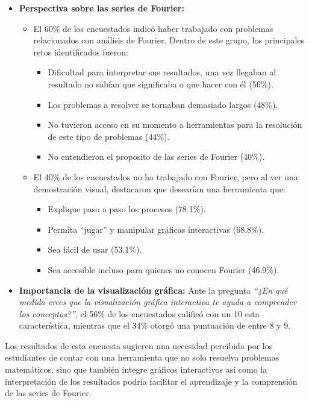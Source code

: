 \begin{itemize}
	\item \textbf{Perspectiva sobre las series de Fourier:}
	\begin{itemize}
		\item El 60\% de los encuestados indicó haber trabajado con problemas relacionados con análisis de Fourier. Dentro de este grupo, los principales retos identificados fueron:
		\begin{itemize}
			\item Dificultad para interpretar sus resultados, una vez llegaban al resultado no sabían que significaba o que hacer con él (56\%).
			\item Los problemas a resolver se tornaban demasiado largos (48\%).
			\item No tuvieron acceso en su momento a herramientas para la resolución de este tipo de problemas (44\%).
			\item No entendieron el proposito de las series de Fourier (40\%).
		\end{itemize}
		\item El 40\% de los encuestados no ha trabajado con Fourier, pero al ver una demostración visual, destacaron que desearían una herramienta que:
		\begin{itemize}
			\item Explique paso a paso los procesos (78.1\%).
			\item Permita ``jugar'' y manipular gráficas interactivas (68.8\%).
			\item Sea fácil de usar (53.1\%).
			\item Sea accesible incluso para quienes no conocen Fourier (46.9\%).
		\end{itemize}
	\end{itemize}
	
	\item \textbf{Importancia de la visualización gráfica:} Ante la pregunta \textit{“¿En qué medida crees que la visualización gráfica interactiva te ayuda a comprender los conceptos?”}, el 56\% de los encuestados calificó con un 10 esta característica, mientras que el 34\% otorgó una puntuación de entre 8 y 9.
\end{itemize}

Los resultados de esta encuesta sugieren una necesidad percibida por los estudiantes de contar con una herramienta que no solo resuelva problemas matemáticos, sino que también integre gráficos interactivos así como la interpretación de los resultados podría facilitar el aprendizaje y la comprensión de las series de Fourier.


